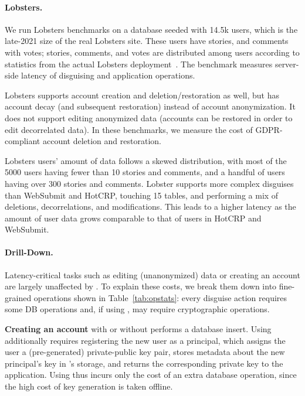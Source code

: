 \paragraph{Lobsters.}
%
We run Lobsters benchmarks on a database seeded with 14.5k users, which
is the late-2021 size of the real Lobsters site.
%
These users have  stories, and  comments with votes;
stories, comments, and votes are distributed among users according to
statistics from the actual Lobsters deployment~\cite{lobsters-data}.
%
The benchmark measures server-side latency of disguising and application
operations.
%

Lobsters supports account creation and deletion/restoration as well, but has account decay (and
subsequent restoration) instead of account anonymization.  It does not support editing anonymized
data (accounts can be restored in order to edit decorrelated data). In these benchmarks, we measure
the cost of GDPR-compliant account deletion and restoration.


Lobsters users' amount of data follows a skewed distribution, with most of the 5000 users
having fewer than 10 stories and comments, and a handful of users having over 300 stories and
comments. Lobster supports more complex disguises than WebSubmit and HotCRP,
touching 15 tables, and performing a mix of deletions, decorrelations, and modifications. This leads
to a higher latency as the amount of user data grows comparable to that of users in HotCRP and
WebSubmit.


\paragraph{Drill-Down.}
%
Latency-critical tasks such as editing (unanonymized) data or
creating an account are largely unaffected by \sys.
%
To explain these costs, we break them down into fine-grained operations shown in
Table~\ref{tab:opstats}: every disguise action requires some DB operations and,
if using \sys, may require cryptographic operations.

\textbf{Creating an account} with or without \sys performs a database insert. Using \sys additionally
requires registering the new user as a principal, which assigns the user a (pre-generated)
private-public key pair, stores metadata about the new principal's key in \sys's storage, and
returns the corresponding private key to the application.
Using \sys thus incurs only the cost of an extra database operation, since the high cost of key
generation is taken offline.

